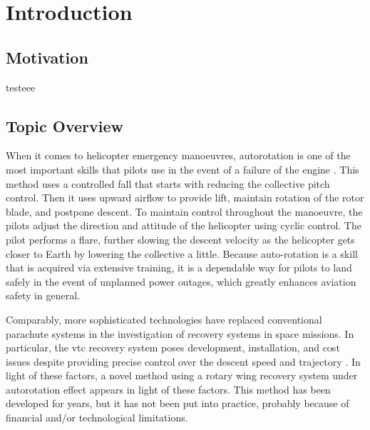 
\chapter{Introduction}
\label{chapter:introduction}


\section{Motivation}
\label{section:motivation}

testeee


\section{Topic Overview}
\label{section:topic_overview}

When it comes to helicopter emergency manoeuvres, autorotation is one of the most important skills that pilots use in the event of a failure of the engine \cite{federal_aviation_administration_helicopter_2021}. This method uses a controlled fall that starts with reducing the collective pitch control. Then it uses upward airflow to provide lift, maintain rotation of the rotor blade, and postpone descent. To maintain control throughout the manoeuvre, the pilots adjust the direction and attitude of the helicopter using cyclic control. The pilot performs a flare, further slowing the descent velocity as the helicopter gets closer to Earth by lowering the collective a little. Because auto-rotation is a skill that is acquired via extensive training, it is a dependable way for pilots to land safely in the event of unplanned power outages, which greatly enhances aviation safety in general.

Comparably, more sophisticated technologies have replaced conventional parachute systems in the investigation of recovery systems in space missions. In particular, the \gls{vtc} recovery system poses development, installation, and cost issues despite providing precise control over the descent speed and trajectory \cite{federal_aviation_administration_helicopter_2021}. In light of these factors, a novel method using a rotary wing recovery system under autorotation effect appears in light of these factors. This method has been developed for years, but it has not been put into practice, probably because of financial and/or technological limitations.


